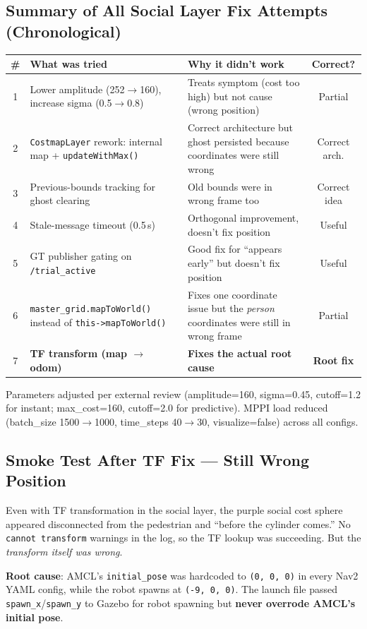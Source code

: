 \documentclass[11pt]{article}
\newcommand{\logentry}[1]{\subsection*{#1}}
\begin{document}
\logentry{Summary of All Social Layer Fix Attempts (Chronological)}
\begin{center}
\begin{tabular}{|c|p{5cm}|p{4cm}|c|}
\hline
\textbf{\#} & \textbf{What was tried} & \textbf{Why it didn't work} & \textbf{Correct?} \\
\hline
1 & Lower amplitude (252$\to$160), increase sigma (0.5$\to$0.8) &
    Treats symptom (cost too high) but not cause (wrong position) & Partial \\
\hline
2 & \texttt{CostmapLayer} rework: internal map + \texttt{updateWithMax()} &
    Correct architecture but ghost persisted because coordinates were still wrong & Correct arch. \\
\hline
3 & Previous-bounds tracking for ghost clearing &
    Old bounds were in wrong frame too & Correct idea \\
\hline
4 & Stale-message timeout (0.5\,s) &
    Orthogonal improvement, doesn't fix position & Useful \\
\hline
5 & GT publisher gating on \texttt{/trial\_active} &
    Good fix for ``appears early'' but doesn't fix position & Useful \\
\hline
6 & \texttt{master\_grid.mapToWorld()} instead of \texttt{this->mapToWorld()} &
    Fixes one coordinate issue but the \emph{person} coordinates were still in wrong frame & Partial \\
\hline
7 & \textbf{TF transform (map $\to$ odom)} &
    \textbf{Fixes the actual root cause} & \textbf{Root fix} \\
\hline
\end{tabular}
\end{center}

\noindent Parameters adjusted per external review (amplitude=160,
sigma=0.45, cutoff=1.2 for instant; max\_cost=160, cutoff=2.0 for
predictive). MPPI load reduced (batch\_size 1500$\to$1000,
time\_steps 40$\to$30, visualize=false) across all configs.

\logentry{Smoke Test After TF Fix --- Still Wrong Position}
Even with TF transformation in the social layer, the purple social cost sphere
appeared disconnected from the pedestrian and ``before the cylinder comes.''
No \texttt{cannot transform} warnings in the log, so the TF lookup was
succeeding. But the \emph{transform itself was wrong}.

\textbf{Root cause}: AMCL's \texttt{initial\_pose} was hardcoded to
\texttt{(0, 0, 0)} in every Nav2 YAML config, while the robot spawns at
\texttt{(-9, 0, 0)}. The launch file passed \texttt{spawn\_x}/\texttt{spawn\_y}
to Gazebo for robot spawning but \textbf{never overrode AMCL's initial pose}.
\end{document}
